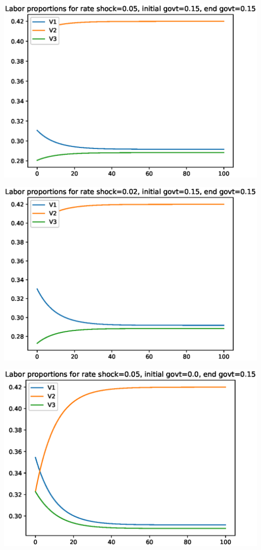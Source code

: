 \documentclass[12pt]{article}
\theoremstyle{definition}
\begin{document}
\begin{minipage}{\linewidth}
\begin{framed}
\begin{minipage}[t]{.48\textwidth}
\centering
\includegraphics[width=1\textwidth]{images/econ_0_run_0_labor}
\end{minipage}\hfill
\begin{minipage}[t]{.48\textwidth}
\centering
\includegraphics[width=1\textwidth]{images/econ_0_run_1_labor}
\end{minipage}\hfill
\begin{minipage}[t]{.48\textwidth}
\centering
\includegraphics[width=1\textwidth]{images/econ_0_run_2_labor}

\end{minipage}
\end{framed}
\end{minipage}
\end{document}
